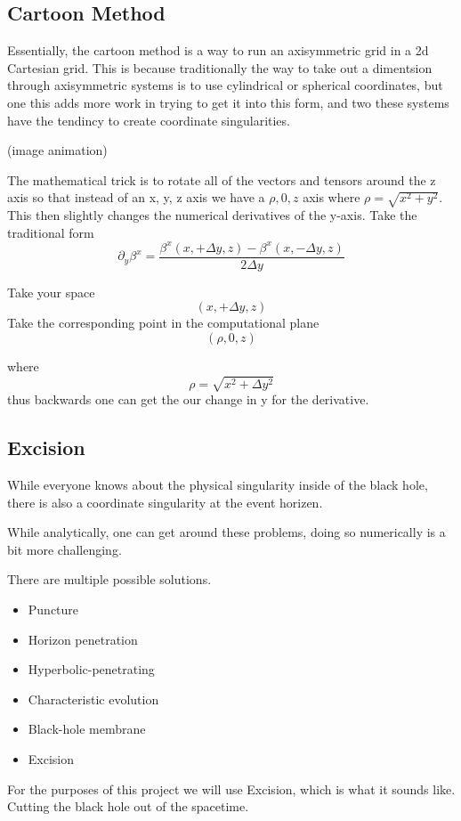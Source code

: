 \subsection{Cartoon Method}

Essentially, the cartoon method is a way to run an axisymmetric grid in a 2d Cartesian grid. This is because traditionally the way to take out a dimentsion through axisymmetric systems is to use cylindrical or spherical coordinates, but one this adds more work in trying to get it into this form, and two these systems have the tendincy to create coordinate singularities.

(image animation)

The mathematical trick is to rotate all of the vectors and tensors around the z axis so that instead of an x, y, z axis we have a $\rho, 0, z$ axis where $\rho = \sqrt{x^2+y^2}$. This then slightly changes the numerical derivatives of the y-axis. Take the traditional form
\[
	\partial_y \beta^x = \frac{\beta^x(x,+\Delta y, z) - \beta^x(x, -\Delta y, z)}{2 \Delta y}
\]

Take your space
\[
	(x, + \Delta y, z)
\]
Take the corresponding point in the computational plane
\[
	(\rho, 0, z)
\]

where
\[
	\rho = \sqrt{x^2 + \Delta y^2}
\]
thus backwards one can get the our change in y for the derivative.

\subsection{Excision}

While everyone knows about the physical singularity inside of the black hole, there is also a coordinate singularity at the event horizen.

While analytically, one can get around these problems, doing so numerically is a bit more challenging.

There are multiple possible solutions.
\begin{itemize}
	\item Puncture
	\item Horizon penetration
	\item Hyperbolic-penetrating
	\item Characteristic evolution
	\item Black-hole membrane
	\item Excision
\end{itemize}

For the purposes of this project we will use Excision, which is what it sounds like. Cutting the black hole out of the spacetime.

